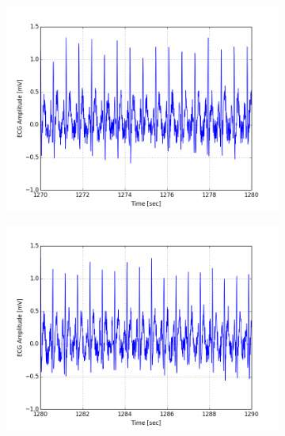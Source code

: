 \documentclass[paper=a4, fontsize=11pt]{scrartcl}
\numberwithin{equation}{section}		%
\numberwithin{figure}{section}			%
\numberwithin{table}{section}		    %
\begin{document}
\begin{appendices}
\begin{figure}[H]
	\centering
	\begin{subfigure}[b]{0.3\textwidth}
		\includegraphics[width=\textwidth]{sim/ecg_34}
	\end{subfigure}
	\begin{subfigure}[b]{0.3\textwidth}
		\includegraphics[width=\textwidth]{sim/ecg_35}
	\end{subfigure}
	\begin{subfigure}[b]{0.3\textwidth}

\end{subfigure}
\end{figure}
\end{appendices}
\end{document}
